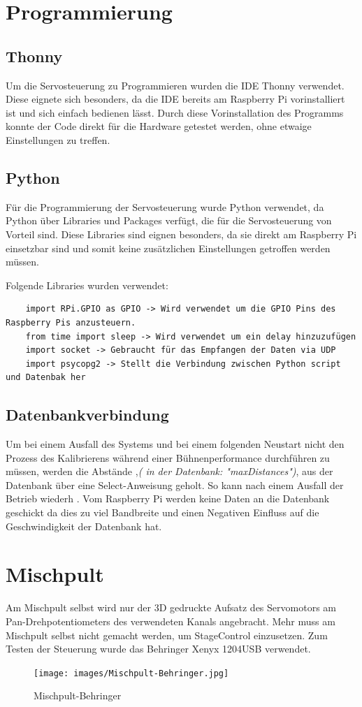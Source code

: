\section{Programmierung}
\subsection{Thonny}
Um die Servosteuerung zu Programmieren wurden die IDE Thonny verwendet. Diese eignete sich besonders, da die IDE bereits am Raspberry Pi vorinstalliert ist und sich einfach bedienen lässt. Durch diese Vorinstallation des Programms konnte der Code direkt für die Hardware getestet werden, ohne etwaige Einstellungen zu treffen.

\subsection{Python}
Für die Programmierung der Servosteuerung wurde Python verwendet, da Python über Libraries und Packages verfügt, die für die Servosteuerung von Vorteil sind. Diese Libraries sind eignen besonders, da sie direkt am Raspberry Pi einsetzbar sind und somit keine zusätzlichen Einstellungen getroffen werden müssen.

Folgende Libraries wurden verwendet:

\begin{lstlisting}
	import RPi.GPIO as GPIO -> Wird verwendet um die GPIO Pins des Raspberry Pis anzusteuern.
	from time import sleep -> Wird verwendet um ein delay hinzuzufügen
	import socket -> Gebraucht für das Empfangen der Daten via UDP
	import psycopg2 -> Stellt die Verbindung zwischen Python script und Datenbak her
\end{lstlisting}

\subsection{Datenbankverbindung}
Um bei einem Ausfall des Systems und bei einem folgenden Neustart nicht den Prozess des Kalibrierens während einer Bühnenperformance durchführen zu müssen, werden die Abstände ,\textit{( in der Datenbank: "maxDistances")}, aus der Datenbank über eine Select-Anweisung geholt. So kann nach einem Ausfall der Betrieb wiederh . Vom Raspberry Pi werden keine Daten an die Datenbank geschickt da dies zu viel Bandbreite und einen Negativen Einfluss auf die Geschwindigkeit der Datenbank hat.

\section{Mischpult}
Am Mischpult selbst wird nur der 3D gedruckte Aufsatz des Servomotors am Pan-Drehpotentiometers des verwendeten Kanals angebracht. Mehr muss am Mischpult selbst nicht gemacht werden, um StageControl einzusetzen. Zum Testen der Steuerung wurde das Behringer Xenyx 1204USB verwendet.


\begin{figure}[H]
	\centering
	\texttt{[image: images/Mischpult-Behringer.jpg]}
	\caption[Mischpult-Behringer]{Mischpult-Behringer}
	\label{fig: Mischpult-Behringer}
\end{figure}
